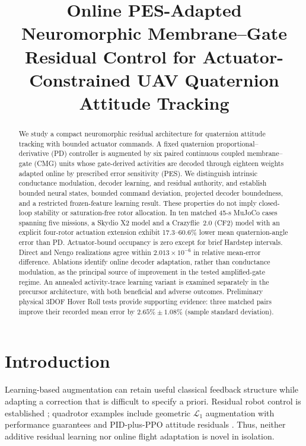\documentclass[letterpaper,10pt,conference]{IEEEtran}
\title{Online PES-Adapted Neuromorphic Membrane--Gate Residual Control for
Actuator-Constrained UAV Quaternion Attitude Tracking}
\author{%
\IEEEauthorblockN{Gandhi Contreras\IEEEauthorrefmark{1}, Steven Sandoval\IEEEauthorrefmark{1}, Luis Garcia\IEEEauthorrefmark{2}}%
\IEEEauthorblockA{\IEEEauthorrefmark{1}New Mexico State University (NMSU), Las Cruces, NM, USA}%
\IEEEauthorblockA{\IEEEauthorrefmark{2}U.S. Air Force, Los Alamos, NM, USA}%
}
\begin{document}
\maketitle
\thispagestyle{empty}
\pagestyle{empty}

\begin{abstract}
We study a compact neuromorphic residual architecture for quaternion attitude
tracking with bounded actuator commands. A fixed quaternion proportional--
derivative (PD) controller is augmented by six paired continuous
coupled membrane--gate (CMG) units whose gate-derived activities are decoded
through eighteen weights adapted online by prescribed error sensitivity
(PES). We distinguish intrinsic conductance modulation, decoder learning,
and residual authority, and establish bounded neural states, bounded command
deviation, projected decoder boundedness, and a restricted frozen-feature
learning result. These properties do not imply closed-loop stability or
saturation-free rotor allocation. In ten matched 45-s MuJoCo cases spanning
five missions, a Skydio X2 model and a Crazyflie~2.0 (CF2) model with an
explicit four-rotor actuation extension exhibit 17.3--60.6\% lower mean
quaternion-angle error than PD. Actuator-bound occupancy is zero except for
brief Hardstep intervals. Direct and Nengo realizations agree within
$2.013\times10^{-6}$ in relative mean-error difference. Ablations identify
online decoder adaptation, rather than conductance modulation, as the
principal source of improvement in the tested amplified-gate regime. An
annealed activity-trace learning variant is examined separately in the
precursor architecture, with both beneficial and adverse outcomes.
Preliminary physical 3DOF Hover Roll tests provide supporting evidence: three
matched pairs improve their recorded mean error by
$2.65\%\pm1.08\%$ (sample standard deviation).
\end{abstract}

\section{Introduction}
Learning-based augmentation can retain useful classical feedback structure
while adapting a correction that is difficult to specify a priori.
Residual robot control is established \cite{johannink2019}; quadrotor
examples include geometric $\mathcal L_1$ augmentation with performance
guarantees \cite{wu2025l1quad} and PID-plus-PPO attitude residuals
\cite{li2027hpappo}. Thus, neither additive residual learning nor online
flight adaptation is novel in isolation.
\end{document}
